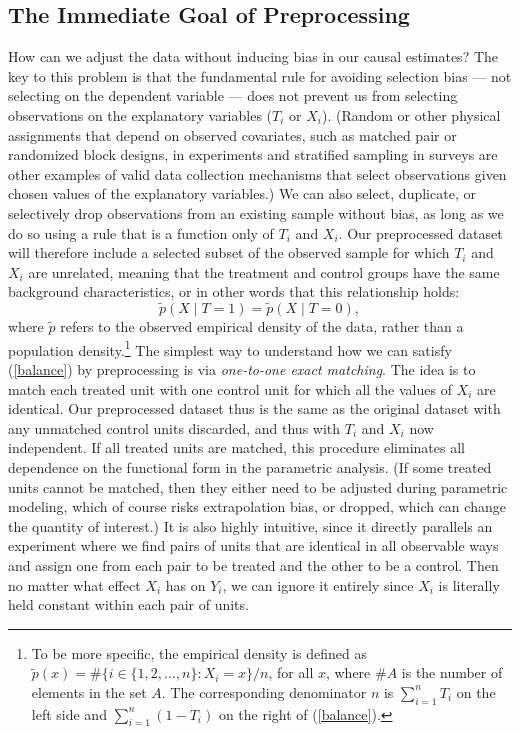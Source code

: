 \documentclass[11pt,titlepage]{article}
\begin{document}
\subsection{The Immediate Goal of Preprocessing}\label{s:immed}
How can we adjust the data without inducing bias in our causal
estimates?  The key to this problem is that the fundamental rule for
avoiding selection bias --- not selecting on the dependent variable
--- does not prevent us from selecting observations on the explanatory
variables ($T_i$ or $X_i$).  (Random or other physical assignments
that depend on observed covariates, such as matched pair or randomized
block designs, in experiments and stratified sampling in surveys are
other examples of valid data collection mechanisms that select
observations given chosen values of the explanatory variables.)  We
can also select, duplicate, or selectively drop observations from an
existing sample without bias, as long as we do so using a rule that is
a function only of $T_i$ and $X_i$.  Our preprocessed dataset will
therefore include a selected subset of the observed sample for which
$T_i$ and $X_i$ are unrelated, meaning that the treatment and control
groups have the same background characteristics, or in other words
that this relationship holds:
\begin{equation}
  \label{balance}
  \tilde p(X\mid T=1) = \tilde p(X\mid T=0),
\end{equation}
where $\tilde p$ refers to the observed empirical density of the data,
rather than a population density.\footnote{To be more specific, the
  empirical density is defined as $\tilde p(x) = \# \{ i\in \{1, 2,
  \dots, n \}: X_i = x \} / n$, for all $x$, where $\#A$ is the number
  of elements in the set $A$.  The corresponding denominator $n$ is
  $\sum_{i=1}^n T_i$ on the left side and $\sum_{i=1}^n (1-T_i)$ on
  the right of (\ref{balance}).}  The simplest way to understand how
we can satisfy (\ref{balance}) by preprocessing is via
\emph{one-to-one exact matching}.  The idea is to match each treated
unit with one control unit for which all the values of $X_i$ are
identical.  Our preprocessed dataset thus is the same as the original
dataset with any unmatched control units discarded, and thus with
$T_i$ and $X_i$ now independent.  If all treated units are matched,
this procedure eliminates all dependence on the functional form in the
parametric analysis.  (If some treated units cannot be matched, then
they either need to be adjusted during parametric modeling, which of
course risks extrapolation bias, or dropped, which can change the
quantity of interest.) It is also highly intuitive, since it directly
parallels an experiment where we find pairs of units that are
identical in all observable ways and assign one from each pair to be
treated and the other to be a control.  Then no matter what effect
$X_i$ has on $Y_i$, we can ignore it entirely since $X_i$ is literally
held constant within each pair of units.
\end{document}
